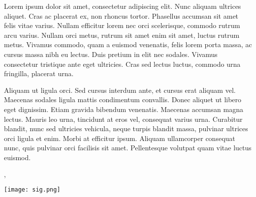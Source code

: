




% 
% 

% 
% 

\vspace{-0.1in}\setlength\parindent{24pt}
\noindent
Lorem ipsum dolor sit amet, consectetur adipiscing elit. Nunc aliquam ultrices aliquet. Cras ac placerat ex, non rhoncus tortor. Phasellus accumsan sit amet felis vitae varius. Nullam efficitur lorem nec orci scelerisque, commodo rutrum arcu varius. Nullam orci metus, rutrum sit amet enim sit amet, luctus rutrum metus. Vivamus commodo, quam a euismod venenatis, felis lorem porta massa, ac cursus massa nibh eu lectus. Duis pretium in elit nec sodales. Vivamus consectetur tristique ante eget ultricies. Cras sed lectus luctus, commodo urna fringilla, placerat urna.

Aliquam ut ligula orci. Sed cursus interdum ante, et cursus erat aliquam vel. Maecenas sodales ligula mattis condimentum convallis. Donec aliquet ut libero eget dignissim. Etiam gravida bibendum venenatis. Maecenas accumsan magna lectus. Mauris leo urna, tincidunt at eros vel, consequat varius urna. Curabitur blandit, nunc sed ultricies vehicula, neque turpis blandit massa, pulvinar ultrices orci ligula et enim. Morbi at efficitur ipsum. Aliquam ullamcorper consequat nunc, quis pulvinar orci facilisis sit amet. Pellentesque volutpat quam vitae luctus euismod.

\vspace{0.1in}
\vfill

\begin{flushright}
\closer,

\vspace{-0.1in}\texttt{[image: sig.png]}\vspace{-0.1in}

\myname\\
\mytitle
\end{flushright}

